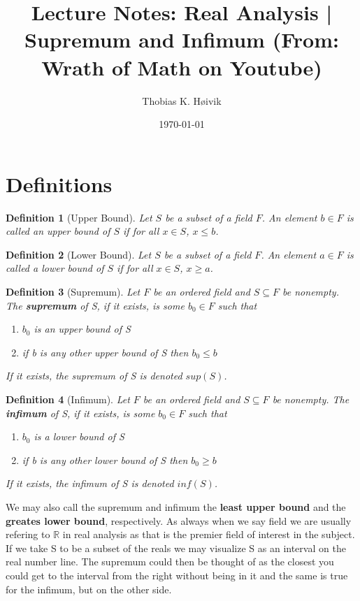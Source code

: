 \documentclass[12pt]{article}
\title{Lecture Notes: Real Analysis | Supremum and Infimum (From: Wrath of Math on Youtube)}
\author{Thobias K. Høivik}
\date{\today}
\newtheorem{definition}{Definition}
\begin{document}
\maketitle
\section*{Definitions}
\begin{definition}[Upper Bound]
    Let \( S \) be a subset of a field \( F \). 
    An element \( b \in F \) is called an \textit{upper bound} 
    of \( S \) if for all \( x \in S \), \( x \leq b \).
\end{definition}

\begin{definition}[Lower Bound]
    Let \( S \) be a subset of a field \( F \). 
    An element \( a \in F \) is called a \textit{lower bound} of 
    \( S \) if for all \( x \in S \), \( x \geq a \).
\end{definition}

\begin{definition}[Supremum]
    Let \(F\) be an ordered field and \(S \subseteq F\) be nonempty.
    The \textbf{supremum} of S, if it exists, is some \(b_0 \in F\) 
    such that 
    \begin{enumerate}
        \item \(b_0\) is an upper bound of S 
        \item if b is any other upper bound of S then \(b_0 \leq b\)
    \end{enumerate}
    If it exists, the supremum of S is denoted \(sup(S)\).
    
\end{definition}
\begin{definition}[Infimum]
    Let \(F\) be an ordered field and \(S \subseteq F\) be nonempty.
    The \textbf{infimum} of S, if it exists, is some \(b_0 \in F\) 
    such that 
    \begin{enumerate}
        \item \(b_0\) is a lower bound of S 
        \item if b is any other lower bound of S then \(b_0 \geq b\)
    \end{enumerate}
    If it exists, the infimum of S is denoted \(inf(S)\).
    
\end{definition}

\noindent 
We may also call the supremum and infimum the \textbf{least upper bound} and 
the \textbf{greates lower bound}, respectively.
As always when we say field we are usually refering to \(\mathbb R\) in real 
analysis as that is the premier field of interest in the subject.
If we take S to be a subset of the reals we may visualize S as an interval 
on the real number line. The supremum could then be thought of as 
the closest you could get to the interval from the right without being in it 
and the same is true for the infimum, but on the other side.
\end{document}
